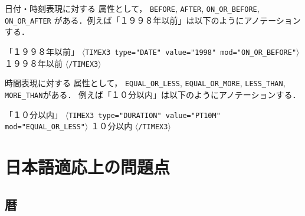 \documentclass[japanese]{jnlp_1.4}
\newcommand{\modified}[1]{}
\def\timexiii{}
\def\value{}
\def\valuefromsurface{}
\def\mod{}
\begin{document}
日付・時刻表現に対する \mod 属性として，
{\tt BEFORE}, {\tt AFTER}, {\tt ON\_OR\_BEFORE}, {\tt ON\_OR\_AFTER}
がある．例えば「１９９８年以前」は以下のようにアノテーションする．

{\addtolength{\linewidth}{-6zw}\setlength{\leftskip}{3zw}
\begin{itembox}[l]{「１９９８年以前」}
{\small
{\tt $\langle$TIMEX3 type="DATE" value="1998" mod="ON\_OR\_BEFORE"$\rangle$}１９９８年以前
{\tt $\langle$/TIMEX3$\rangle$} }
\end{itembox}
\par}

時間表現に対する \mod 属性として，
{\tt EQUAL\_OR\_LESS}, {\tt EQUAL\_OR\_MORE}, 
{\tt LESS\_THAN}, {\tt MORE\_THAN}がある．
例えば「１０分以内」は以下のようにアノテーションする．

{\addtolength{\linewidth}{-6zw}\setlength{\leftskip}{3zw}
\begin{itembox}[l]{「１０分以内」}
{\small
{\tt $\langle$TIMEX3 type="DURATION" value="PT10M" mod="EQUAL\_OR\_LESS"$\rangle$}
１０分以内
{\tt $\langle$/TIMEX3$\rangle$} }
\end{itembox}
\par}


\section{\timexiii 日本語適応上の問題点}

\modified{本節では $\langle$TIMEX3$\rangle$ の日本語適応について問題となった事例
について個別に紹介する．基本的には \valuefromsurface に日本語特有の表示を用い，
\value に TimeMLに適合した表示を用いる．
必要に応じて韓国語のデータ K-TimeML \cite{KTimeML}に準拠した Korean Timebank 1.0/2.0 でどのような扱いを行っているのかを付記する．}


\subsection{暦}

\modified{日本語に \timexiii を適応するうえで一番大きな問題として，和暦の問題が
ある．日本語では元号法に基づいた「昭和」「平成」などの年表記がテキスト中に出現す
 る．これについては \valuefromsurface に「明治」「大正」「昭和」「平成」を表
 現する ``M'', ``T'', ``S'', ``H'' の接頭子を二ケタの数字表現に付与することで記述
 し，\value に西暦に換算したものを記述することとする．上記四つ以外の元号について
 は \value 相当に西暦を記述するのみで対処する．
元号以外の時代名（例：「江戸時代」）については，時間情報表現として切り出しを行う
 のみで，\value 相当は空白とした．
 }
\end{document}
